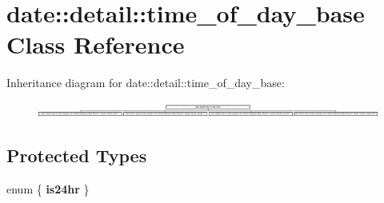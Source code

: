 \hypertarget{classdate_1_1detail_1_1time__of__day__base}{}\section{date\+::detail\+::time\+\_\+of\+\_\+day\+\_\+base Class Reference}
\label{classdate_1_1detail_1_1time__of__day__base}
Inheritance diagram for date\+::detail\+::time\+\_\+of\+\_\+day\+\_\+base\+:\begin{figure}[H]
\begin{center}
\leavevmode
\includegraphics[height=0.476190cm]{classdate_1_1detail_1_1time__of__day__base}
\end{center}
\end{figure}
\subsection*{Protected Types}
\begin{DoxyCompactItemize}
\item 
\mbox{\label{classdate_1_1detail_1_1time__of__day__base_aed6557d24bc8ecbd09e2d85b175520ce}} 
enum \{ {\bfseries is24hr}
 \}
\end{DoxyCompactItemize}
